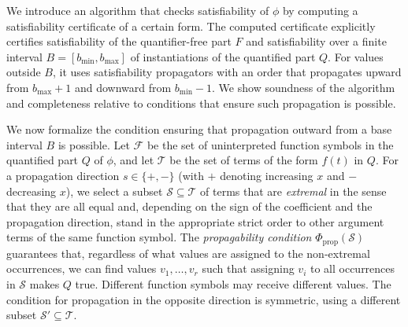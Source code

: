 \documentclass[runningheads]{llncs}
\begin{document}
We introduce an algorithm that checks satisfiability of $\phi$  by computing a satisfiability certificate of a certain form. 
The computed certificate explicitly certifies satisfiability of the quantifier-free part $F$ and satisfiability over a finite interval $B = [b_{\min}, b_{\max}]$ of instantiations of the quantified part $Q$. For values outside $B$, it uses satisfiability propagators with an order that propagates upward from $b_{\max}+1$ and downward from $b_{\min}-1$. We show soundness of the algorithm and completeness relative to conditions that ensure such propagation is possible.


We now formalize the condition ensuring that propagation outward from a base interval $B$ is possible. Let $\mathcal{F}$ be the set of uninterpreted function symbols in the quantified part $Q$ of $\phi$, and let $\mathcal{T}$ be the set of terms of the form $f(t)$ in $Q$. For a propagation direction $s \in \{+, -\}$ (with $+$ denoting increasing $x$ and $-$ decreasing $x$), we select a subset $\mathcal{S} \subseteq \mathcal{T}$ of terms that are \emph{extremal} in the sense that they are all equal and, depending on the sign of the coefficient and the propagation direction, stand in the appropriate strict order to other argument terms of the same function symbol. The \emph{propagability condition} $\Phi_{\text{prop}}(\mathcal{S})$ guarantees that, regardless of what values are assigned to the non‑extremal occurrences, we can find values $v_1,\dots,v_r$ such that assigning $v_i$ to all occurrences in $\mathcal{S}$ makes $Q$ true. Different function symbols may receive different values. The condition for propagation in the opposite direction is symmetric, using a different subset $\mathcal{S}' \subseteq \mathcal{T}$.
\end{document}
